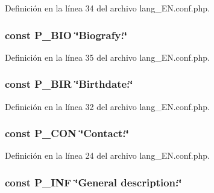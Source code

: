 Definición en la línea 34 del archivo lang\-\_\-\-E\-N.\-conf.\-php.

\hypertarget{lang__EN_8conf_8php_a333498935f4e2cb6c3904bd31379e25e}{
\subsubsection[{P\-\_\-\-B\-I\-O}]{\setlength{\rightskip}{0pt plus 5cm}const P\-\_\-\-B\-I\-O \char`\"{}Biografy\-:\char`\"{}}}\label{lang__EN_8conf_8php_a333498935f4e2cb6c3904bd31379e25e}


Definición en la línea 35 del archivo lang\-\_\-\-E\-N.\-conf.\-php.

\hypertarget{lang__EN_8conf_8php_aef69547e66d1ba07f314ea1c00149ecb}{
\subsubsection[{P\-\_\-\-B\-I\-R}]{\setlength{\rightskip}{0pt plus 5cm}const P\-\_\-\-B\-I\-R \char`\"{}Birthdate\-:\char`\"{}}}\label{lang__EN_8conf_8php_aef69547e66d1ba07f314ea1c00149ecb}


Definición en la línea 32 del archivo lang\-\_\-\-E\-N.\-conf.\-php.

\hypertarget{lang__EN_8conf_8php_ad3f5472a251165b7eb05aa8e4084a10c}{
\subsubsection[{P\-\_\-\-C\-O\-N}]{\setlength{\rightskip}{0pt plus 5cm}const P\-\_\-\-C\-O\-N \char`\"{}Contact\-:\char`\"{}}}\label{lang__EN_8conf_8php_ad3f5472a251165b7eb05aa8e4084a10c}


Definición en la línea 24 del archivo lang\-\_\-\-E\-N.\-conf.\-php.

\hypertarget{lang__EN_8conf_8php_a31d1da665267d377fc62572b9b2e09fa}{
\subsubsection[{P\-\_\-\-I\-N\-F}]{\setlength{\rightskip}{0pt plus 5cm}const P\-\_\-\-I\-N\-F \char`\"{}General description\-:\char`\"{}}}\label{lang__EN_8conf_8php_a31d1da665267d377fc62572b9b2e09fa}


